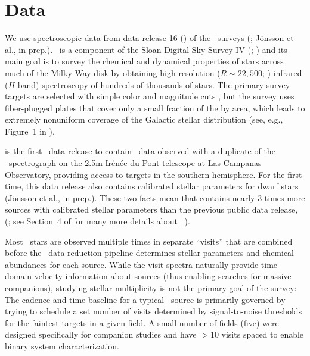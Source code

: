 \documentclass[modern]{aastex63}
\begin{document}
\section{Data} \label{sec:data}

We use spectroscopic data from data release 16 () of the \apogee\ surveys
(\citealt{Majewski:2017, DR16}; J\"onsson et al., in prep.).
\apogee\ is a component of the Sloan Digital Sky Survey IV (\sdssiv;
\citealt{Gunn:2006, Blanton:2017}) and its main goal is to survey the chemical
and dynamical properties of stars across much of the Milky Way disk by obtaining
high-resolution ($R \sim 22,500$; \citealt{Wilson:2019}) infrared ($H$-band)
spectroscopy of hundreds of thousands of stars.
The primary survey targets are selected with simple color and magnitude cuts
\citep{Zasowski:2013, Zasowski:2017}, but the survey uses fiber-plugged plates
that cover only a small fraction of the by area, which leads to extremely
nonuniform coverage of the Galactic stellar distribution (see, e.g., Figure~1 in
\citealt{DR16}).

 is the first \sdss\ data release to contain \apogee\ data observed with
a duplicate of the \apogee\ spectrograph on the 2.5m Ir\'en\'ee du Pont
telescope \citep{Bowen:1973} at Las Campanas Observatory, providing access to
targets in the southern hemisphere.
For the first time, this data release also contains calibrated stellar
parameters for dwarf stars (J\"onsson et al., in prep.).
These two facts mean that  contains nearly 3 times more sources with
calibrated stellar parameters than the previous public data release, 
(\citealt{Abolfathi:2017, Holtzman:2018}; see Section~4 of \citealt{DR16} for
many more details about \apogee\ ).

Most \apogee\ stars are observed multiple times in separate ``visits'' that are
combined before the \apogee\ data reduction pipeline \citep{Nidever:2015,
Zamora:2015, ASPCAP} determines stellar parameters and chemical abundances for
each source.
While the visit spectra naturally provide time-domain velocity information about
sources (thus enabling searches for massive companions), studying stellar
multiplicity is not the primary goal of the survey:
The cadence and time baseline for a typical \apogee\ source is primarily
governed by trying to schedule a set number of visits determined by
signal-to-noise thresholds for the faintest targets in a given field.
A small number of fields (five) were designed specifically for companion studies
and have $>10$ visits spaced to enable binary system characterization.
\end{document}
